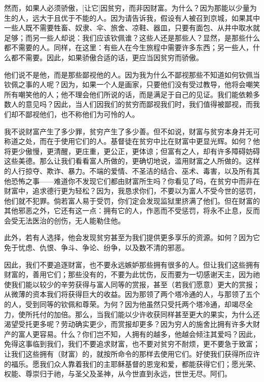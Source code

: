 然而，如果人必须骄傲，[让它]因贫穷，而非因财富。为什么？因为那能以少量为生的人，远大于且优于不能的人。因为请告诉我，假设有人被召到京城，如果其中一些人既不需要牲畜、奴隶、伞、旅舍、凉鞋、器皿，只要有面包、从井中取水就足够；而另一些人却说：我们应该钦佩谁？这些人还是那些人？显然，是那些什么都不需要的人。同样，在这里：有些人在今生旅程中需要许多东西；另一些人，什么都不需要。因此，如果骄傲合适的话，更应当因贫穷而骄傲。\par

他们说不是他，而是那些鄙视他的人。因为我为什么不鄙视那些不知道如何钦佩当钦佩之事的人呢？因为，如果一个人是画家，只要他们没有受过教导，他将会嘲笑所有嘲笑他的人；他不理会他们所说的话，而是满足于自己的见证。我们能依赖多数人的意见吗？因此，当人们因我们的贫穷而鄙视我们时，我们值得被鄙视，而我们却不鄙视他们，也不称他们为可怜的人。\par

我不说财富产生了多少罪，贫穷产生了多少善。但不如说，财富与贫穷本身并无可称道之处，而在于使用它们的人。基督徒在贫穷中比在财富中更显光辉。如何？他将更少傲慢，更清醒，更庄重，更公正，更体谅；但富有之人，却有许多障碍妨碍这些美德。那么让我们看看富人所做的，更确切地说，滥用财富之人所做的。这样的人行掠夺、欺诈、暴力。不端的爱情、不圣洁的结合、巫术、毒害，以及所有其他恐怖之事——难道你不发现它们都由财富所生吗？你看见了吗，在贫穷中而非在财富中，追求德行更为轻松？因为，我恳求你们，不要以为富人不受今世的惩罚，他们就不犯罪。倘若富人易于受罚，你们定会发现监狱里挤满了他们。但在财富的其他邪恶之外，它还有这一点：拥有它的人，作恶而不受惩罚，将永不止息，反而会受无法医治的创伤，无人能勒住他。\par

此外，若有人选择，他会发现贫穷甚至为我们提供更多享乐的资源。如何？因为它免于忧虑、仇恨、争斗、争论、纷争，以及数不清的邪恶。\par

因此，我们不要追逐财富，也不要永远嫉妒那些拥有很多的人。但让我们这些拥有财富的，善用它们；那些没有的，不要为此忧伤，反而要为一切感谢天主，因为祂使我们能以较少的辛劳获得与富人同等的赏报，甚至（若我们愿意）更大的赏报；从微薄的资本我们将获得巨大的收益。因为那领了两个塔冷通的人，与那领了五个的人，受到同等的钦佩和尊荣。为何？因为他虽然只受托两个塔冷通，却竭尽全力，使所托付的加倍。那么，当我们能以少许收获同样甚至更大的果实，为什么还渴望受托更多呢？劳动确实更少，而赏报却更多？因为穷人的施舍比拥有许多大财产的富人更容易。什么？你们岂不知，人拥有的越多，他越会倾注其爱吗？因此，免得这事临到我们，我们不要追求财富，也不要对贫穷不耐烦，更不要急于致富；让我们这些拥有（财富）的，就按所命令的那样去使用它们。好使我们获得所应许的福乐。愿我们众人靠着我们的主耶稣基督的恩宠和爱，都能获得它们；愿光荣、权能、尊崇归于祂，与圣父及圣神，从今世直到永远，世世无尽。阿们。\par


